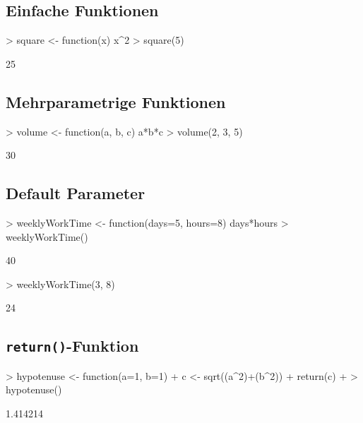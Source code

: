 \subsection{Einfache Funktionen}

\begin{Schunk}
\begin{Sinput}
> square <- function(x) {x^2}
> square(5)
\end{Sinput}
\begin{Soutput}
[1] 25
\end{Soutput}
\end{Schunk}

\subsection{Mehrparametrige Funktionen}

\begin{Schunk}
\begin{Sinput}
> volume <- function(a, b, c) {a*b*c}
> volume(2, 3, 5)
\end{Sinput}
\begin{Soutput}
[1] 30
\end{Soutput}
\end{Schunk}

\subsection{Default Parameter}

\begin{Schunk}
\begin{Sinput}
> weeklyWorkTime <- function(days=5, hours=8) {days*hours}
> weeklyWorkTime()
\end{Sinput}
\begin{Soutput}
[1] 40
\end{Soutput}
\begin{Sinput}
> weeklyWorkTime(3, 8)
\end{Sinput}
\begin{Soutput}
[1] 24
\end{Soutput}
\end{Schunk}

\subsection{\lstinline{return()}-Funktion}

\begin{Schunk}
\begin{Sinput}
> hypotenuse <- function(a=1, b=1) {
+ 		c <- sqrt((a^2)+(b^2)) 
+ 		return(c)
+ 	}
> hypotenuse()
\end{Sinput}
\begin{Soutput}
[1] 1.414214
\end{Soutput}
\end{Schunk}
